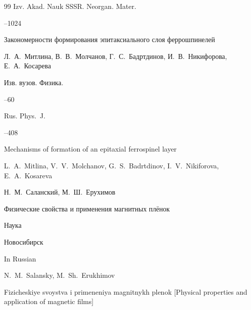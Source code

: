 \begin{thebibliography}{99}
\jour Izv. Akad. Nauk SSSR. Neorgan. Mater.



–1024 





\paper Закономерности формирования эпитаксиального слоя феррошпинелей

\by Л.~А.~Митлина, В.~В.~Молчанов, Г.~С.~Бадртдинов, И.~В.~Никифорова, Е.~А.~Косарева

\jour Изв. вузов. Физика. 




--60


\transl 

\jour Rus. Phys.~J.




--408

\paper Mechanisms of formation of an epitaxial ferrospinel layer

\by L.~A.~Mitlina, V.~V.~Molchanov, G.~S.~Badrtdinov, I.~V.~Nikiforova, E.~A.~Kosareva 








\by Н.~М.~Саланский, М.~Ш.~Ерухимов

\book Физические свойства и применения магнитных плёнок

\publ Наука

\publaddr Новосибирск



\misctransl

\lang In Russian

\by N.~M.~Salansky, M.~Sh.~Erukhimov  

\book Fizicheskiye svoystva i primeneniya magnitnykh plenok \rm [Physical properties and application of magnetic films]


\end{thebibliography}
